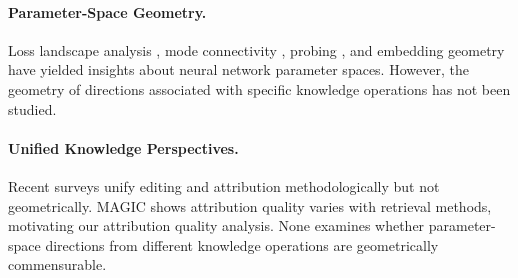 \paragraph{Parameter-Space Geometry.}
Loss landscape analysis \citep{li2018visualizing}, mode connectivity \citep{draxler2018essentially,frankle2020linear}, probing \citep{hewitt2019structural}, and embedding geometry \citep{ethayarajh2019contextual} have yielded insights about neural network parameter spaces.
However, the geometry of directions associated with specific knowledge operations has not been studied.

\paragraph{Unified Knowledge Perspectives.}
Recent surveys \citep{zhang2025unified} unify editing and attribution methodologically but not geometrically.
MAGIC \citep{zhao2025magic} shows attribution quality varies with retrieval methods, motivating our attribution quality analysis.
None examines whether parameter-space directions from different knowledge operations are geometrically commensurable.
